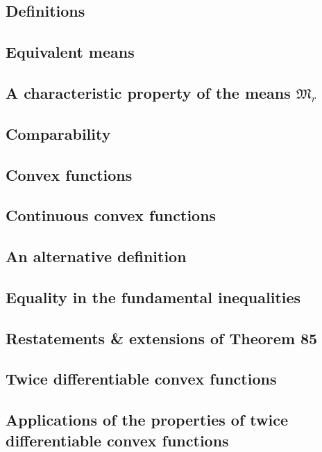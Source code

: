 \documentclass[oneside]{book}
\numberwithin{equation}{section}
\begin{document}
\subsection{Definitions}

\subsection{Equivalent means}

\subsection{A characteristic property of the means $\mathfrak{M}_r$}

\subsection{Comparability}

\subsection{Convex functions}

\subsection{Continuous convex functions}

\subsection{An alternative definition}

\subsection{Equality in the fundamental inequalities}

\subsection{Restatements \& extensions of Theorem 85}

\subsection{Twice differentiable convex functions}

\subsection{Applications of the properties of twice differentiable convex functions}
\end{document}
